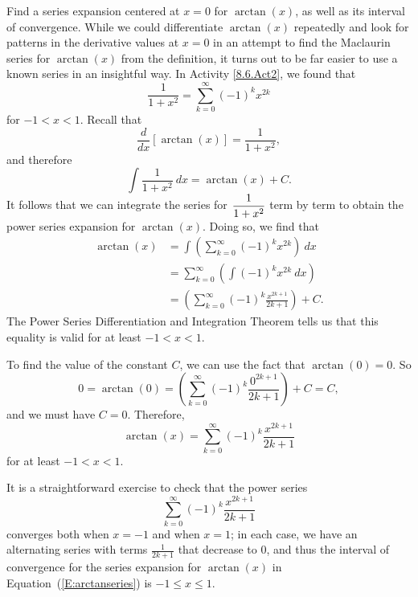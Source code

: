 \bex \label{Ex:8.6.3}  Find a series expansion centered at $x = 0$ for $\arctan(x)$, as well as its interval of convergence.
\eex
While we could differentiate $\arctan(x)$  repeatedly and look for patterns in the derivative values at $x = 0$ in an attempt to find the Maclaurin series for $\arctan(x)$ from the definition, it turns out to be far easier to use a known series in an insightful way. In Activity \ref{8.6.Act2}, we found that
\[\frac{1}{1+x^2} = \sum_{k=0}^{\infty} (-1)^k x^{2k}\]
for $-1 < x < 1$. Recall that
\[\frac{d}{dx} \left[ \arctan(x) \right] = \frac{1}{1+x^2},\]
and therefore
\[\int \frac{1}{1+x^2} \ dx = \arctan(x) + C.\]
It follows that we can integrate the series for $\displaystyle \frac{1}{1+x^2}$ term by term to obtain the power series expansion for $\arctan(x)$.  Doing so, we find that
\begin{align*}
\arctan(x) &= \int \left( \sum_{k=0}^{\infty} (-1)^kx^{2k} \right) \ dx \\
    &= \sum_{k=0}^{\infty} \left( \int (-1)^k x^{2k} \ dx \right) \\
    &= \left( \sum_{k=0}^{\infty} (-1)^k\frac{x^{2k+1}}{2k+1} \right) + C.
\end{align*}
The Power Series Differentiation and Integration Theorem tells us that this equality is valid for at least $-1 < x < 1$.

To find the value of the constant $C$, we can use the fact that $\arctan(0) = 0$. So
\[0 = \arctan(0) = \left( \sum_{k=0}^{\infty} (-1)^k\frac{0^{2k+1}}{2k+1} \right) + C = C,\]
and we must have $C = 0$. Therefore,
\begin{equation} \label{E:arctanseries}
\arctan(x) = \sum_{k=0}^{\infty} (-1)^k\frac{x^{2k+1}}{2k+1}
\end{equation}
for at least $-1 < x < 1$.

It is a straightforward exercise to check that the power series
$$ \sum_{k=0}^{\infty} (-1)^k\frac{x^{2k+1}}{2k+1}$$
converges both when $x = -1$ and when $x = 1$; in each case, we have an alternating series with terms $\frac{1}{2k+1}$ that decrease to 0, and thus the interval of convergence for the series expansion for $\arctan(x)$ in Equation~(\ref{E:arctanseries}) is $-1 \le x \le 1.$

\afterex



%


